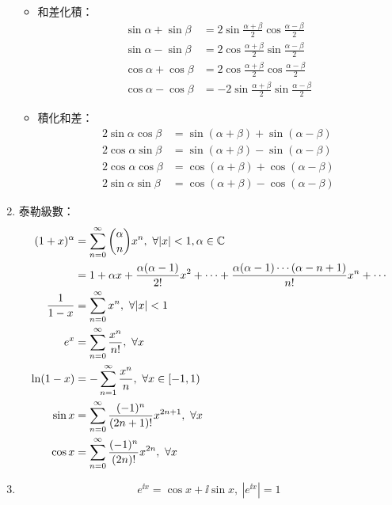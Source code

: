 \begin{enumerate}
\begin{itemize}
\begin{subequations}
            \end{subequations}
        \item 和差化積： \begin{subequations}
            \begin{align}
                \sin\alpha + \sin\beta & = 2\sin\frac{\alpha + \beta}{2}\cos\frac{\alpha - \beta}{2} \\
                \sin\alpha - \sin\beta & = 2\cos\frac{\alpha + \beta}{2}\sin\frac{\alpha - \beta}{2} \\
                \cos\alpha + \cos\beta & = 2\cos\frac{\alpha + \beta}{2}\cos\frac{\alpha - \beta}{2} \\
                \cos\alpha - \cos\beta & = -2\sin\frac{\alpha + \beta}{2}\sin\frac{\alpha - \beta}{2}
            \end{align}
        \end{subequations}
        \item 積化和差： \begin{subequations}
            \begin{align}
                2\sin\alpha\cos\beta & = \sin(\alpha + \beta) + \sin(\alpha - \beta) \\
                2\cos\alpha\sin\beta & = \sin(\alpha + \beta) - \sin(\alpha - \beta) \\
                2\cos\alpha\cos\beta & = \cos(\alpha + \beta) + \cos(\alpha - \beta) \\
                2\sin\alpha\sin\beta & = \cos(\alpha + \beta) - \cos(\alpha - \beta)
            \end{align}
        \end{subequations}
    \end{itemize}
    \item 泰勒級數：\begin{subequations}
        \begin{align}
            (1 + x)^{\alpha} & = \sum_{n = 0}^{\infty}\binom{\alpha}{n}x^n, \ \forall |x| < 1, \alpha \in \C \\
            & = 1 + \alpha x + \frac{\alpha(\alpha - 1)}{2!}x^2 + \cdots + \frac{\alpha(\alpha - 1)\cdots(\alpha - n + 1)}{n!}x^n + \cdots \\
            \frac{1}{1 - x} & = \sum_{n = 0}^{\infty}x^n, \ \forall |x| < 1 \\
            e^x & = \sum_{n = 0}^{\infty}\frac{x^n}{n!}, \ \forall x \\
            \ln(1 - x) & = -\sum_{n = 1}^{\infty}\frac{x^n}{n}, \ \forall x \in [-1, 1) \\
            \sin x & = \sum_{n = 0}^{\infty}\frac{(-1)^n}{(2n + 1)!}x^{2n + 1}, \ \forall x \\
            \cos x & = \sum_{n = 0}^{\infty}\frac{(-1)^n}{(2n)!}x^{2n}, \ \forall x
        \end{align}
    \end{subequations}
    \item \begin{equation}
        e^{\ii x} = \cos x + \ii\sin x, \ |e^{\ii x}| = 1
    \end{equation}
\end{enumerate}

\pagebreak